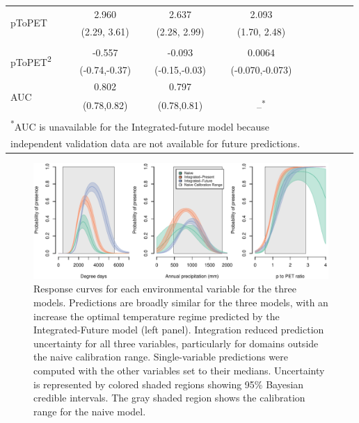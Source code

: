 \documentclass[11pt]{article}
\begin{document}
\begin{table}[t]
\begin{tabular}{lcccccccc}
	\multirow{2}{*}{pToPET} & 2.960 & 2.637 & 2.093 \\
	& (2.29, 3.61) & (2.28, 2.99) & (1.70, 2.48) \\
	& & & \\
	
	\multirow{2}{*}{pToPET\textsuperscript{2}} & -0.557 & -0.093 & 0.0064 \\
	& (-0.74,-0.37) & (-0.15,-0.03) & (-0.070,-0.073) \\
	\midrule
	\multirow{2}{*}{AUC} & 0.802 & 0.797 & \\
	& (0.78,0.82) & (0.78,0.81) & --\textsuperscript{*}\\
	\bottomrule
	\multicolumn{4}{l}{\footnotesize \textsuperscript{*}AUC is unavailable for the Integrated-future model because} \\ 
	\multicolumn{4}{l}{\footnotesize independent validation data are not available for future predictions.}
	\end{tabular}
	\label{tab:ex2_params}
\end{table}

\begin{figure}[t]
	\includegraphics[width=6.5in]{figs/ex2_response.pdf}
	\caption{Response curves for each environmental variable for the three models.
	Predictions are broadly similar for the three models, with an increase the optimal temperature regime predicted by the Integrated-Future model (left panel).
	Integration reduced prediction uncertainty for all three variables, particularly for domains outside the naive calibration range.
	Single-variable predictions were computed with the other variables set to their medians.
	Uncertainty is represented by colored shaded regions showing 95\% Bayesian credible intervals.
	The gray shaded region shows the calibration range for the naive model.
}
	\label{fig:ex2_response}
\end{figure}
\end{document}
